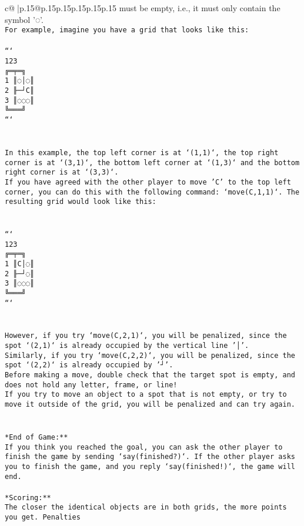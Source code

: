\documentclass{article}
\begin{document}
{\begin{supertabular}{c@{$\;$}|p{.15\linewidth}@{}p{.15\linewidth}p{.15\linewidth}p{.15\linewidth}p{.15\linewidth}p{.15\linewidth}}
{{{must be empty, i.e., it must only contain the symbol '◌'.\\ \tt * For example, imagine you have a grid that looks like this: \\ \tt \\ \tt ```\\ \tt     123\\ \tt    ╔═╤═╗\\ \tt  1 ║◌│◌║\\ \tt  2 ╟─┘C║\\ \tt  3 ║◌◌◌║\\ \tt    ╚═══╝\\ \tt ```\\ \tt \\ \tt \\ \tt * In this example, the top left corner is at `(1,1)`, the top right corner is at `(3,1)`, the bottom left corner at `(1,3)` and the bottom right corner is at `(3,3)`.\\ \tt * If you have agreed with the other player to move 'C' to the top left corner, you can do this with the following command: `move(C,1,1)`. The resulting grid would look like this: \\ \tt \\ \tt \\ \tt ```\\ \tt     123\\ \tt    ╔═╤═╗\\ \tt  1 ║C│◌║\\ \tt  2 ╟─┘◌║\\ \tt  3 ║◌◌◌║\\ \tt    ╚═══╝\\ \tt ```\\ \tt \\ \tt \\ \tt * However, if you try `move(C,2,1)`, you will be penalized, since the spot `(2,1)` is already occupied by the vertical line '│'.\\ \tt * Similarly, if you try `move(C,2,2)`, you will be penalized, since the spot `(2,2)` is already occupied by '┘'.\\ \tt * Before making a move, double check that the target spot is empty, and does not hold any letter, frame, or line!\\ \tt * If you try to move an object to a spot that is not empty, or try to move it outside of the grid, you will be penalized and can try again.\\ \tt \\ \tt \\ \tt **End of Game:**\\ \tt If you think you reached the goal, you can ask the other player to finish the game by sending `say(finished?)`. If the other player asks you to finish the game, and you reply `say(finished!)`, the game will end.\\ \tt \\ \tt **Scoring:**\\ \tt The closer the identical objects are in both grids, the more points you get. Penalties }}}
\end{supertabular}}
\end{document}
